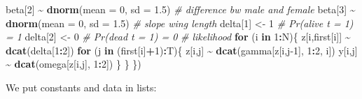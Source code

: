 \documentclass[
  12pt,
]{krantz}
\newenvironment{Shaded}{\begin{snugshade}}{\end{snugshade}}
\newcommand{\AttributeTok}[1]{\textcolor[rgb]{0.13,0.29,0.53}{#1}}
\newcommand{\CommentTok}[1]{\textcolor[rgb]{0.56,0.35,0.01}{\textit{#1}}}
\newcommand{\ControlFlowTok}[1]{\textcolor[rgb]{0.13,0.29,0.53}{\textbf{#1}}}
\newcommand{\DecValTok}[1]{\textcolor[rgb]{0.00,0.00,0.81}{#1}}
\newcommand{\FloatTok}[1]{\textcolor[rgb]{0.00,0.00,0.81}{#1}}
\newcommand{\FunctionTok}[1]{\textcolor[rgb]{0.13,0.29,0.53}{\textbf{#1}}}
\newcommand{\NormalTok}[1]{#1}
\newcommand{\OtherTok}[1]{\textcolor[rgb]{0.56,0.35,0.01}{#1}}
\newcommand{\SpecialCharTok}[1]{\textcolor[rgb]{0.81,0.36,0.00}{\textbf{#1}}}
\newcommand{\StringTok}[1]{\textcolor[rgb]{0.31,0.60,0.02}{#1}}
\begin{document}
\begin{Shaded}
\begin{Highlighting}[]
\NormalTok{  beta[}\DecValTok{2}\NormalTok{] }\SpecialCharTok{\textasciitilde{}} \FunctionTok{dnorm}\NormalTok{(}\AttributeTok{mean =} \DecValTok{0}\NormalTok{, }\AttributeTok{sd =} \FloatTok{1.5}\NormalTok{) }\CommentTok{\# difference bw male and female}
\NormalTok{  beta[}\DecValTok{3}\NormalTok{] }\SpecialCharTok{\textasciitilde{}} \FunctionTok{dnorm}\NormalTok{(}\AttributeTok{mean =} \DecValTok{0}\NormalTok{, }\AttributeTok{sd =} \FloatTok{1.5}\NormalTok{) }\CommentTok{\# slope wing length}
\NormalTok{  delta[}\DecValTok{1}\NormalTok{] }\OtherTok{\textless{}{-}} \DecValTok{1}          \CommentTok{\# Pr(alive t = 1) = 1}
\NormalTok{  delta[}\DecValTok{2}\NormalTok{] }\OtherTok{\textless{}{-}} \DecValTok{0}          \CommentTok{\# Pr(dead t = 1) = 0}
  \CommentTok{\# likelihood}
  \ControlFlowTok{for}\NormalTok{ (i }\ControlFlowTok{in} \DecValTok{1}\SpecialCharTok{:}\NormalTok{N)\{}
\NormalTok{    z[i,first[i]] }\SpecialCharTok{\textasciitilde{}} \FunctionTok{dcat}\NormalTok{(delta[}\DecValTok{1}\SpecialCharTok{:}\DecValTok{2}\NormalTok{])}
    \ControlFlowTok{for}\NormalTok{ (j }\ControlFlowTok{in}\NormalTok{ (first[i]}\SpecialCharTok{+}\DecValTok{1}\NormalTok{)}\SpecialCharTok{:}\NormalTok{T)\{}
\NormalTok{      z[i,j] }\SpecialCharTok{\textasciitilde{}} \FunctionTok{dcat}\NormalTok{(gamma[z[i,j}\DecValTok{{-}1}\NormalTok{], }\DecValTok{1}\SpecialCharTok{:}\DecValTok{2}\NormalTok{, i])}
\NormalTok{      y[i,j] }\SpecialCharTok{\textasciitilde{}} \FunctionTok{dcat}\NormalTok{(omega[z[i,j], }\DecValTok{1}\SpecialCharTok{:}\DecValTok{2}\NormalTok{])}
\NormalTok{    \}}
\NormalTok{  \}}
\NormalTok{\})}
\end{Highlighting}
\end{Shaded}

We put constants and data in lists:

\begin{Shaded}
\end{Shaded}
\end{document}
